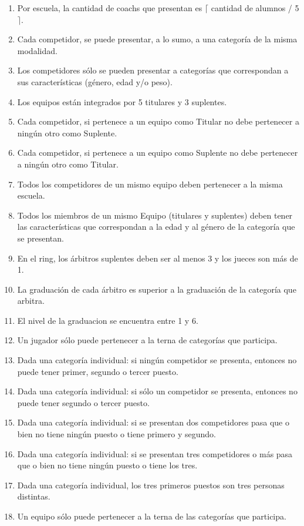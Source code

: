 \begin{enumerate}
\item Por escuela, la cantidad de coachs que presentan es $\lceil$ cantidad de alumnos / 5 $\rceil$.
\item Cada competidor, se puede presentar, a lo sumo, a una categoría de la misma modalidad.
\item Los competidores s\'olo se pueden presentar a categor\'ias que correspondan a sus caracter\'isticas (g\'enero, edad y/o peso).
\item Los equipos están integrados por 5 titulares y 3 suplentes.
\item Cada competidor, si pertenece a un equipo como Titular no debe pertenecer a ning\'un otro como Suplente.
\item Cada competidor, si pertenece a un equipo como Suplente no debe pertenecer a ning\'un otro como Titular.
\item Todos los competidores de un mismo equipo deben pertenecer a la misma escuela.
\item Todos los miembros de un mismo Equipo (titulares y suplentes) deben tener las caracter\'isticas que correspondan a la edad y al g\'enero de la categor\'ia que se presentan.
\item En el ring, los \'arbitros suplentes deben ser al menos 3 y los jueces son m\'as de 1.
\item La graduaci\'on de cada \'arbitro es superior a la graduaci\'on de la categor\'ia que arbitra.
\item El nivel de la graduacion se encuentra entre 1 y 6.
\item Un jugador s\'olo puede pertenecer a la terna de categor\'ias que participa.
\item Dada una categor\'ia individual: si ning\'un competidor se presenta, entonces no puede tener primer, segundo o tercer puesto.
\item Dada una categor\'ia individual: si s\'olo un competidor se presenta, entonces no puede tener segundo o tercer puesto.
\item Dada una categor\'ia individual: si se presentan dos competidores pasa que o bien no tiene ning\'un puesto o tiene primero y segundo.
\item Dada una categor\'ia individual: si se presentan tres competidores o m\'as pasa que o bien no tiene ning\'un puesto o tiene los tres.
\item Dada una categor\'ia individual, los tres primeros puestos son tres personas distintas.
\item Un equipo s\'olo puede pertenecer a la terna de las categor\'ias que participa.

\end{enumerate}
